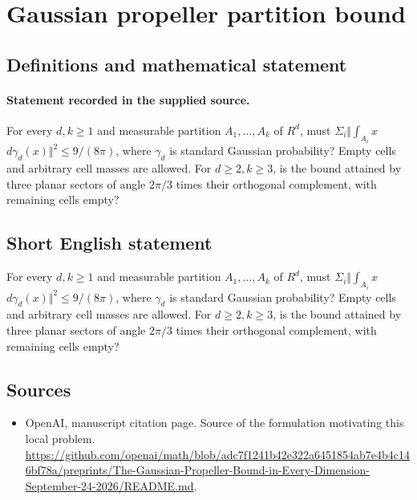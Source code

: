 \documentclass[11pt]{article}
\begin{document}
\section*{Gaussian propeller partition bound}\label{statement}
\subsection{Definitions and mathematical statement}
\paragraph{Statement recorded in the supplied source.}
For every $d,k\geq 1$ and measurable partition $A_{1},\dots ,A_k$ of $R^{d}$, must $\Sigma _i\Vert \int _{A_i}x$ $d\gamma _d(x)\Vert ^{2}\leq 9/(8\pi )$, where $\gamma _d$ is standard Gaussian probability? Empty cells and arbitrary cell masses are allowed. For $d\geq 2,k\geq 3$, is the bound attained by three planar sectors of angle $2\pi /3$ times their orthogonal complement, with remaining cells empty?
\subsection{Short English statement}
For every $d,k\geq 1$ and measurable partition $A_{1},\dots ,A_k$ of $R^{d}$, must $\Sigma _i\Vert \int _{A_i}x$ $d\gamma _d(x)\Vert ^{2}\leq 9/(8\pi )$, where $\gamma _d$ is standard Gaussian probability? Empty cells and arbitrary cell masses are allowed. For $d\geq 2,k\geq 3$, is the bound attained by three planar sectors of angle $2\pi /3$ times their orthogonal complement, with remaining cells empty?
\subsection{Sources}
\begin{itemize}
\item[S1] OpenAI, manuscript citation page. Source of the formulation motivating this local problem.
\url{https://github.com/openai/math/blob/adc7f1241b42e322a6451854ab7e4b4c146bf78a/preprints/The-Gaussian-Propeller-Bound-in-Every-Dimension-September-24-2026/README.md}.
\end{itemize}
\end{document}
